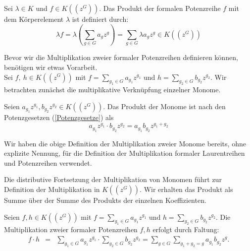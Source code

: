 %
%
%
\begin{defn}\label{MultiplikationMitKörperelement}
Sei $\lambda \in K$ und $f \in K\left(\left(z^{G}\right)\right)$. Das Produkt der formalen Potenzreihe $f$ mit dem Körperelement $\lambda$ ist definiert durch: \[\lambda f = \lambda \left(\sum_{g \in G}^{} a_g z^g\right) = \sum_{g \in G}^{} \lambda a_g z^g \in K\left(\left(z^{G}\right)\right)\]
\end{defn}
  
Bevor wir die Multiplikation zweier formaler Potenzreihen definieren können, benötigen wir etwas Vorarbeit.\\
Sei $f,~ h \in K\left(\left(z^{G}\right)\right)$ mit $ f = \sum_{g_1 \in G}^{} a_{g_1} z^{g_1} \text{ und } h = \sum_{g_2 \in G}^{} b_{g_2} z^{g_2} $. 
%
%
%
%
%
%
Wir betrachten zunächst die multiplikative Verknüpfung einzelner Monome. 
\begin{defn}
Seien $a_{g_1} z^{g_1}, b_{g_2} z^{g_2} \in K\left(\left(z^G\right)\right)$. Das Produkt der Monome ist nach den Potenzgesetzen (\ref{Potenzgesetze}) als 
\[a_{g_1} z^{g_1} \cdot b_{g_2}z^{g_2} = a_{g_1} b_{g_2} z^{g_1 + g_2}\]
\end{defn}
%
%
\begin{bem}
Wir haben die obige Definition der Multiplikation zweier Monome bereits, ohne explizite Nennung, für die Definition der Multiplikation formaler Laurentreihen und Potenzreihen verwendet. 
\end{bem}
%
%
%
%
%
%
%
Die distributive Fortsetzung der Multiplikation von Monomen führt zur Definition der Multiplikation in $K\left(\left(z^{G}\right)\right)$. Wir erhalten das Produkt als Summe über der Summe des Produkts der einzelnen Koeffizienten.
%
%
%
\begin{defn}\label{MultiplikationformalePotenzreihen}
Seien $f, h \in K\left(\left(z^G\right)\right)$ mit $f = \sum_{g_1 \in G}^{} a_{g_1} z^{g_1} \text{ und } h = \sum_{g_2 \in G}^{} b_{g_2} z^{g_2}$. Die Multiplikation zweier formaler Potenzreihen $f, h$ erfolgt durch Faltung: 
\begin{eqnarray*}\label{eq: multPotenzreihenkoerper}  
 f\cdot h &=& \sum_{g_1 \in G}^{} a_{g_1} z^{g_1} \cdot \sum_{g_2 \in G}^{} b_{g_2} z^{g_2} 
= \sum_{g \in G}^{}\sum_{g_1 + g_2 = g}^{}a_{g_1} b_{g_2}z^g.  
\end{eqnarray*} 
\end{defn}
